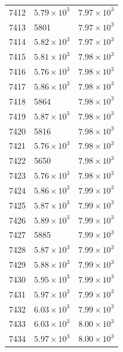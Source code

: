 \begin{table}[H]
\begin{tabular}{lll}
7412 & $\displaystyle 5.79 \times 10^{3}$ & $\displaystyle 7.97 \times 10^{3}$ \\
7413 & 5801 & $\displaystyle 7.97 \times 10^{3}$ \\
7414 & $\displaystyle 5.82 \times 10^{3}$ & $\displaystyle 7.97 \times 10^{3}$ \\
7415 & $\displaystyle 5.81 \times 10^{3}$ & $\displaystyle 7.98 \times 10^{3}$ \\
7416 & $\displaystyle 5.76 \times 10^{3}$ & $\displaystyle 7.98 \times 10^{3}$ \\
7417 & $\displaystyle 5.86 \times 10^{3}$ & $\displaystyle 7.98 \times 10^{3}$ \\
7418 & 5864 & $\displaystyle 7.98 \times 10^{3}$ \\
7419 & $\displaystyle 5.87 \times 10^{3}$ & $\displaystyle 7.98 \times 10^{3}$ \\
7420 & 5816 & $\displaystyle 7.98 \times 10^{3}$ \\
7421 & $\displaystyle 5.76 \times 10^{3}$ & $\displaystyle 7.98 \times 10^{3}$ \\
7422 & 5650 & $\displaystyle 7.98 \times 10^{3}$ \\
7423 & $\displaystyle 5.76 \times 10^{3}$ & $\displaystyle 7.98 \times 10^{3}$ \\
7424 & $\displaystyle 5.86 \times 10^{3}$ & $\displaystyle 7.99 \times 10^{3}$ \\
7425 & $\displaystyle 5.87 \times 10^{3}$ & $\displaystyle 7.99 \times 10^{3}$ \\
7426 & $\displaystyle 5.89 \times 10^{3}$ & $\displaystyle 7.99 \times 10^{3}$ \\
7427 & 5885 & $\displaystyle 7.99 \times 10^{3}$ \\
7428 & $\displaystyle 5.87 \times 10^{3}$ & $\displaystyle 7.99 \times 10^{3}$ \\
7429 & $\displaystyle 5.88 \times 10^{3}$ & $\displaystyle 7.99 \times 10^{3}$ \\
7430 & $\displaystyle 5.95 \times 10^{3}$ & $\displaystyle 7.99 \times 10^{3}$ \\
7431 & $\displaystyle 5.97 \times 10^{3}$ & $\displaystyle 7.99 \times 10^{3}$ \\
7432 & $\displaystyle 6.03 \times 10^{3}$ & $\displaystyle 7.99 \times 10^{3}$ \\
7433 & $\displaystyle 6.03 \times 10^{3}$ & $\displaystyle 8.00 \times 10^{3}$ \\
7434 & $\displaystyle 5.97 \times 10^{3}$ & $\displaystyle 8.00 \times 10^{3}$ \\

\end{tabular}
\end{table}
